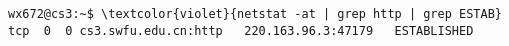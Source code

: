 \documentclass[varwidth,crop]{standalone}
\begin{document}
\begin{Verbatim}[commandchars=\\\{\}]
wx672@cs3:~$ \textcolor{violet}{netstat -at | grep http | grep ESTAB}
tcp  0  0 cs3.swfu.edu.cn:http   220.163.96.3:47179   ESTABLISHED
\end{Verbatim}
\end{document}

